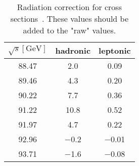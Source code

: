 \begin{table}[ht]
	\centering
	\begin{tabular}{ccc}
		\toprule
	$\sqrt{s}[\si{\giga\eV}]$ &  hadronic &  leptonic\\
	\midrule
\num{88.47} & \num{ 2.0} & \num{ 0.09}\\
\num{89.46} & \num{ 4.3} & \num{ 0.20}\\
\num{90.22} & \num{ 7.7} & \num{ 0.36}\\
\num{91.22} & \num{ 10.8} & \num{ 0.52}\\
\num{91.97} & \num{ 4.7} & \num{ 0.22}\\
\num{92.96} & \num{ -0.2} & \num{ -0.01}\\
\num{93.71} & \num{ -1.6} & \num{ -0.08}\\
\bottomrule
	\end{tabular}
	\caption{Radiation correction for cross sections\label{tab:rad_corr}~\cite{manual}. These values should be added to the "raw" values.}
\end{table}
